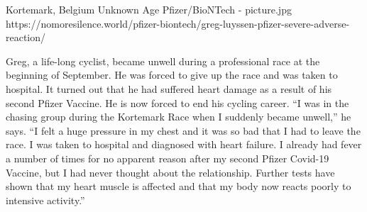 {Kortemark, Belgium}
{Unknown Age}
{Pfizer/BioNTech}
{}
{-}
{picture.jpg}
{https://nomoresilence.world/pfizer-biontech/greg-luyssen-pfizer-severe-adverse-reaction/}
{


Greg, a life-long cyclist, became unwell during a professional race at the
beginning of September. He was forced to give up the race and was taken to
hospital. It turned out that he had suffered heart damage as a result of his
second Pfizer Vaccine. He is now forced to end his cycling career.
“I was in the chasing group during the Kortemark Race when I suddenly became
unwell,” he says. “I felt a huge pressure in my chest and it was so bad
that I had to leave the race. I was taken to hospital and diagnosed with heart
failure. I already had fever a number of times for no apparent reason after my
second Pfizer Covid-19 Vaccine, but I had never thought about the relationship.
Further tests have shown that my heart muscle is affected and that my body now
reacts poorly to intensive activity.”
}
